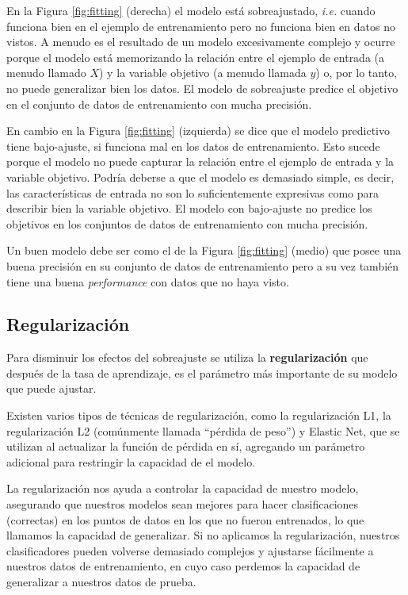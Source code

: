 \documentclass[a4paper,12pt]{article}
\begin{document}
En la Figura \ref{fig:fitting} (derecha) el modelo está sobreajustado, \textit{i.e.} cuando funciona bien en el ejemplo de entrenamiento pero no funciona bien en datos no vistos. A menudo es el resultado de un modelo excesivamente complejo y ocurre porque el modelo está memorizando la relación entre el ejemplo de entrada (a menudo llamado $X$) y la variable objetivo (a menudo llamada $y$) o, por lo tanto, no puede generalizar bien los datos. El modelo de sobreajuste predice el objetivo en el conjunto de datos de entrenamiento con mucha precisión.

En cambio en la Figura \ref{fig:fitting} (izquierda) se dice que el modelo predictivo tiene bajo-ajuste, si funciona mal en los datos de entrenamiento. Esto sucede porque el modelo no puede capturar la relación entre el ejemplo de entrada y la variable objetivo. Podría deberse a que el modelo es demasiado simple, es decir, las características de entrada no son lo suficientemente expresivas como para describir bien la variable objetivo. El modelo con bajo-ajuste no predice los objetivos en los conjuntos de datos de entrenamiento con mucha precisión.

Un buen modelo debe ser como el de la Figura \ref{fig:fitting} (medio) que posee una buena precisión en su conjunto de datos de entrenamiento pero a su vez también tiene una buena \textit{performance} con datos que no haya visto.

\clearpage

\subsection{Regularización}
Para disminuir los efectos del sobreajuste se utiliza la \textbf{regularización} que después de la tasa de aprendizaje, es el parámetro más importante de su modelo que puede ajustar.

Existen varios tipos de técnicas de regularización, como la regularización L1, la regularización L2 (comúnmente llamada “pérdida de peso”) y Elastic Net, que se utilizan al actualizar la función de pérdida en sí, agregando un parámetro adicional para restringir la capacidad de el modelo.

La regularización nos ayuda a controlar la capacidad de nuestro modelo, asegurando que nuestros modelos sean mejores para hacer clasificaciones (correctas) en los puntos de datos en los que no fueron entrenados, lo que llamamos la capacidad de generalizar. Si no aplicamos la regularización, nuestros clasificadores pueden volverse demasiado complejos y ajustarse fácilmente a nuestros datos de entrenamiento, en cuyo caso perdemos la capacidad de generalizar a nuestros datos de prueba.
\end{document}
